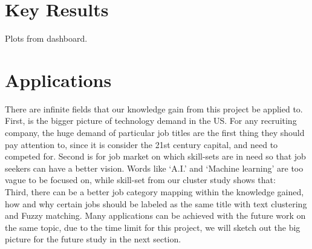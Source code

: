 \section{Key Results}
Plots from dashboard.


\section{Applications}
There are infinite fields that our knowledge gain from this project be applied to. First, is the bigger picture of technology demand in  the US. For any recruiting company, the huge demand of particular job titles are the first thing they should pay attention to, since it is consider the 21st century capital, and need to competed for. Second is for job market on which skill-sets are in need so that job seekers can have a better vision. Words like `A.I.' and `Machine learning' are too vague to be focused on, while skill-set from our cluster study shows that:\\
Third, there can be a better job category mapping within the knowledge gained, how and why certain jobs should be labeled as the same title with text clustering and Fuzzy matching. 
Many applications can be achieved with the future work on the same topic, due to the time limit for this project, we will sketch out the big picture for the future study in the next section. 
